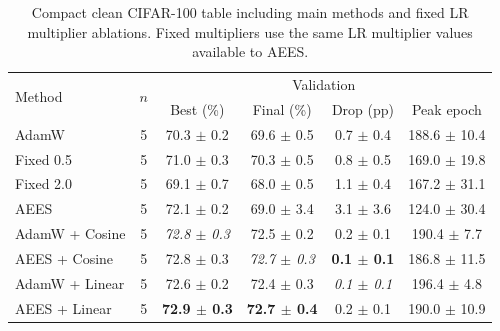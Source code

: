 \begin{table}[htbp]
\centering
\small
\setlength{\tabcolsep}{4.5pt}
\begin{tabular}{lccccc}
\toprule
\multirow{2}{*}{Method} & \multirow{2}{*}{$n$} & \multicolumn{4}{c}{Validation} \\
& & Best (\%) & Final (\%) & Drop (pp) & Peak epoch \\
\midrule
AdamW & 5 & 70.3 $\pm$ 0.2 & 69.6 $\pm$ 0.5 & 0.7 $\pm$ 0.4 & 188.6 $\pm$ 10.4 \\
Fixed 0.5 & 5 & 71.0 $\pm$ 0.3 & 70.3 $\pm$ 0.5 & 0.8 $\pm$ 0.5 & 169.0 $\pm$ 19.8 \\
Fixed 2.0 & 5 & 69.1 $\pm$ 0.7 & 68.0 $\pm$ 0.5 & 1.1 $\pm$ 0.4 & 167.2 $\pm$ 31.1 \\
AEES & 5 & 72.1 $\pm$ 0.2 & 69.0 $\pm$ 3.4 & 3.1 $\pm$ 3.6 & 124.0 $\pm$ 30.4 \\
AdamW + Cosine & 5 & \emph{72.8 $\pm$ 0.3} & 72.5 $\pm$ 0.2 & 0.2 $\pm$ 0.1 & 190.4 $\pm$ 7.7 \\
AEES + Cosine & 5 & 72.8 $\pm$ 0.3 & \emph{72.7 $\pm$ 0.3} & \textbf{0.1 $\pm$ 0.1} & 186.8 $\pm$ 11.5 \\
AdamW + Linear & 5 & 72.6 $\pm$ 0.2 & 72.4 $\pm$ 0.3 & \emph{0.1 $\pm$ 0.1} & 196.4 $\pm$ 4.8 \\
AEES + Linear & 5 & \textbf{72.9 $\pm$ 0.3} & \textbf{72.7 $\pm$ 0.4} & 0.2 $\pm$ 0.1 & 190.0 $\pm$ 10.9 \\
\bottomrule
\end{tabular}
\caption{Compact clean CIFAR-100 table including main methods and fixed LR multiplier ablations. Fixed multipliers use the same LR multiplier values available to AEES.}
\label{tab:cifar_clean_compact_appendix}
\end{table}